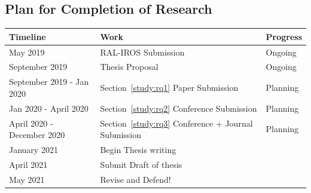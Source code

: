 \documentclass[12pt]{article}
\begin{document}
\subsection{Plan for Completion of Research}
\begin{center}
	\begin{tabular}{ m{5cm}  m{8cm} m{3cm} } 
		Timeline & Work & Progress \\
		\hline
		
		May 2019 & RAL-IROS Submission & Ongoing \\
		
		September 2019 & Thesis Proposal & Ongoing \\ 
		September 2019 - Jan 2020 & Section~\ref{study:rq1} Paper Submission & Planning \\ 
		
		 Jan 2020 - April 2020 & Section~\ref{study:rq2} Conference Submission  & Planning \\
		 
		 April 2020 - December 2020 & Section~\ref{study:rq3} Conference + Journal Submission  & Planning \\
		 
		 January 2021 & Begin Thesis writing & \\
		 April 2021 & Submit Draft of thesis & \\
		 May 2021 & Revise and Defend! & \\
		  
		\hline
	\end{tabular}
\end{center}
\begin{footnotesize}


\end{footnotesize}
\end{document}

